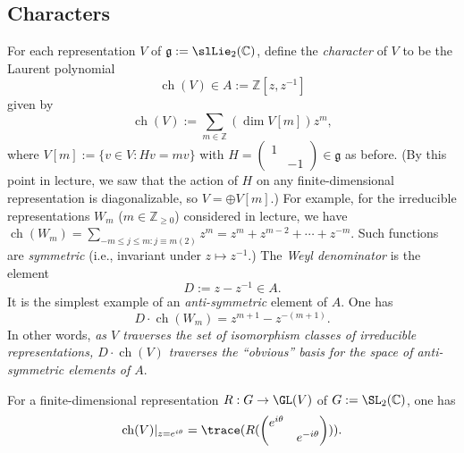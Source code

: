 \documentclass[reqno]{amsart} 
\begin{document}
\subsection{Characters}
\label{sec:orgc5f3d81}
For each representation $V$ of
$\mathfrak{g} := \slLie_2(\mathbb{C})$,
define the \emph{character} of $V$
to be the Laurent polynomial
\begin{equation*}
  \operatorname{ch}(V) \in  A := \mathbb{Z}[z,z^{-1}]
\end{equation*}
given by
\begin{equation*}
  \operatorname{ch}(V) :=
  \sum_{m \in \mathbb{Z}}
  (\dim V[m]) z^m,
\end{equation*}
where
$V[m] := \{v \in V : H v = m v\}$
with $H = \left(
  \begin{smallmatrix}
    1&\\
    &-1
  \end{smallmatrix}
\right) \in \mathfrak{g}$ as before.
(By this point in lecture,
we saw that the action of $H$ on any finite-dimensional
representation
is diagonalizable,
so $V = \oplus V[m]$.)
For example,
for the irreducible representations $W_m$ ($m \in \mathbb{Z}_{\geq 0}$)
considered in lecture,
we have
$\operatorname{ch}(W_m) = \sum_{-m \leq j \leq m : j \equiv m(2)} z^m
= z^m + z^{m-2} + \dotsb + z^{-m}$.
Such functions are \emph{symmetric}
(i.e., invariant under $z \mapsto z^{-1}$.)
The \emph{Weyl denominator}
is the element
\begin{equation*}
  D := z - z^{-1} \in A.
\end{equation*}
It is the simplest example of an \emph{anti-symmetric}
element of $A$.
One has
\begin{equation*}
  D \cdot \operatorname{ch}(W_m)
  = z^{m+1} - z^{-(m+1)}.
\end{equation*}
In other words,
\emph{as $V$ traverses the set of isomorphism
  classes of irreducible
  representations,
  $D \cdot \operatorname{ch}(V)$ traverses the ``obvious''
  basis for the space of anti-symmetric elements of $A$}.

For a finite-dimensional representation $R : G \rightarrow \GL(V)$ of $G :=
\SL_2(\mathbb{C})$,
one has
\begin{equation*}
  \operatorname{ch}(V)|_{z=e^{i \theta}}
  =
  \trace (R(
\begin{pmatrix}
    e^{i \theta} &  \\
     & e^{-i \theta}
  \end{pmatrix}
)).
\end{equation*}
\end{document}
